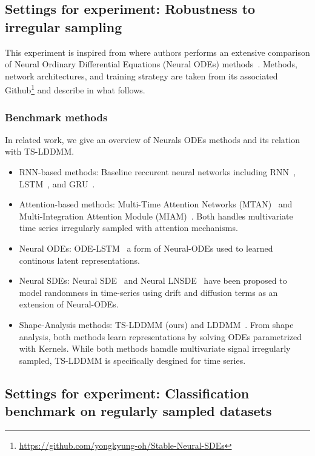\subsection{Settings for experiment: Robustness to irregular sampling}
This experiment is inspired from \cite{oh2024stable} where authors performs an extensive comparison of Neural Ordinary Differential Equations (Neural ODEs) methods~\cite{kidger2020neural}. Methods, network architectures, and training strategy are taken from its associated Github\footnote{\url{https://github.com/yongkyung-oh/Stable-Neural-SDEs}} and describe in what follows.
\label{appendix: settings_robustness}
\subsubsection{Benchmark methods}
In related work, we give an overview of Neurals ODEs methods and its relation with TS-LDDMM.  
\begin{itemize}
  \item RNN-based methods: Baseline reccurent neural networks including RNN~\cite{medsker1999recurrent}, LSTM~\cite{hochreiter1997long}, and GRU~\cite{chung2014empirical}.

  \item Attention-based methods: Multi-Time Attention Networks (MTAN)~\cite{shukla2021multi} and Multi-Integration Attention Module (MIAM)~\cite{lee2022multi}. Both handles multivariate time series irregularly sampled with attention mechanisms.
  \item Neural ODEs: ODE-LSTM~\cite{lechner2020learning} a form of Neural-ODEs used to learned continous latent representations. 
  \item Neural SDEs:  Neural SDE~\cite{liu2019neural} and Neural LNSDE~\cite{oh2024stable} have been proposed to model randomness in time-series using drift and diffusion terms as an extension of Neural-ODEs. 
  \item Shape-Analysis methods: TS-LDDMM (ours) and LDDMM~\cite{glaunes2008large}. From shape analysis, both methods learn representations by solving ODEs parametrized with Kernels. While both methods hamdle multivariate signal irregularly sampled, TS-LDDMM is specifically desgined for time series.
\end{itemize}



\subsection{Settings for experiment: Classification benchmark on regularly sampled datasets}
\label{appendix: settings_classification}

